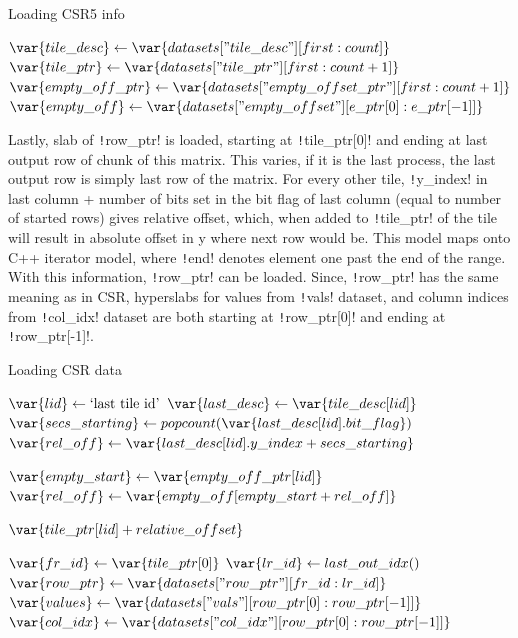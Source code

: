 \documentclass[thesis=M,english]{FITthesis}[2019/12/23]
\newcommand{\csre}[1]{\texttt!#1!}
\begin{document}
\begin{algorithm}
    \caption{Loading CSR5 info}
    \begin{algorithmic}
        \State $\var{tile\_desc} \gets \var{datasets["tile\_desc"][first:count]}$
        \State $\var{tile\_ptr} \gets \var{datasets["tile\_ptr"][first:count+1]}$
        \State $\var{empty\_off\_ptr} \gets \var{datasets["empty\_offset\_ptr"][first:count+1]}$
        \State $\var{empty\_off} \gets \var{datasets["empty\_offset"][e\_ptr[0]:e\_ptr[-1]]}$
        \EndFunction
    \end{algorithmic}
\end{algorithm}

Lastly, slab of \csre{row_ptr} is loaded, starting at \csre{tile_ptr[0]} and
ending at last output row of chunk of this matrix. This varies, if it is the last
process, the last output row is simply last row of the matrix. For every other tile,
\csre{y_index} in last column + number of bits set in the bit flag of last column
(equal to number of started rows) gives relative offset, which, when added to
\csre{tile_ptr} of the tile will result in absolute offset in y where next row would be.
This model maps onto C++ iterator model, where \csre{end} denotes
element one past the end of the range. With this information, \csre{row_ptr} can be
loaded. Since, \csre{row_ptr} has the same meaning as in CSR, hyperslabs for
values from \csre{vals} dataset, and column indices from \csre{col_idx} dataset
are both starting at \csre{row_ptr[0]} and ending at \csre{row_ptr[-1]}.


\begin{algorithm}
    \caption{Loading CSR data}
    \begin{algorithmic}
        \State \(\var{lid} \gets \text{`last tile id'}\)
        \State \(\var{last\_desc} \gets \var{tile\_desc[lid]}\)
        \State \(\var{secs\_starting} \gets popcount(\var{last\_desc[lid].bit\_flag})\)
        \State \(\var{rel\_off} \gets \var{last\_desc[lid].y\_index + secs\_starting}\)

        \State \(\var{empty\_start} \gets \var{empty\_off\_ptr[lid]}\)
        \State \(\var{rel\_off} \gets \var{empty\_off[empty\_start + rel\_off]}\)
        \EndIf

        \Return \(\var{tile\_ptr[lid] + relative\_offset}\)
        \EndFunction

        \State \(\var{fr\_id} \gets \var{tile\_ptr[0]}\)
        \State \(\var{lr\_id} \gets last\_out\_idx()\)
        \State \(\var{row\_ptr} \gets \var{datasets["row\_ptr"][fr\_id:lr\_id]}\)
        \State \(\var{values} \gets \var{datasets["vals"][row\_ptr[0]: row\_ptr[-1]]}\)
        \State \(\var{col\_idx} \gets \var{datasets["col\_idx"][row\_ptr[0]: row\_ptr[-1]]}\)
        \EndFunction
    \end{algorithmic}
\end{algorithm}
\end{document}
